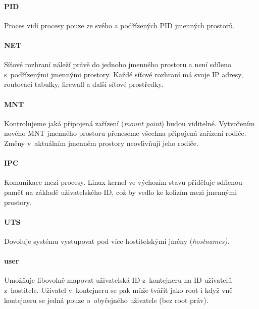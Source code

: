 \paragraph{PID}

Proces vidí procesy pouze ze svého a podřízených PID jmenných prostorů.
\cite{pid_namespaces}

\paragraph{NET}

Síťové rozhraní náleží právě do jednoho jmenného prostoru a není sdíleno s~podřízenými jmennými prostory.
Každé síťové rozhraní má svoje IP adresy, routovací tabulky, firewall a další síťové prostředky. 
\cite{namespaces}

\paragraph{MNT}

Kontrolujeme jaká připojená zařízení (\textit{mount point}) budou viditelné.
Vytvořením nového MNT jmenného prostoru přeneseme všechna připojená zařízení rodiče.
Změny v~aktuálním jmenném prostory neovlivňují jeho rodiče.
\cite{mnt_namespaces}

\paragraph{IPC}

Komunikace mezi procesy.
Linux kernel ve výchozím stavu přiděluje sdílenou paměť na základě uživatelského ID, což by vedlo ke kolizím mezi jmennými prostory.
\cite{namespaces}

\paragraph{UTS}

Dovoluje systému vystupovat pod více hostitelskými jmény (\textit{hostnames)}.
\cite{namespaces}

\paragraph{user}

Umožňuje libovolně mapovat uživatelská ID z~kontejneru na ID uživatelů z~hostitele.
Uživatel v~kontejneru se pak může tvářit jako root i když vně kontejneru se jedná pouze o~obyčejného uživatele (bez root práv).
\cite{user_namespaces}

